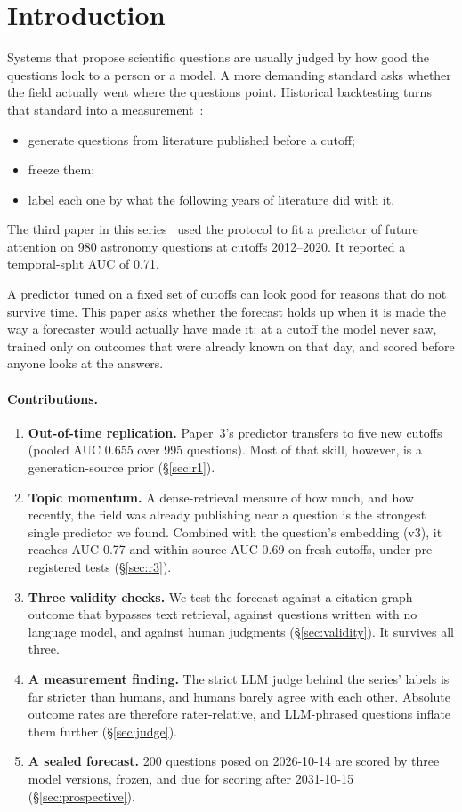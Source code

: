 \documentclass[11pt]{article}
\begin{document}
\section{Introduction}

Systems that propose scientific questions are usually judged by how good the
questions look to a person or a model. A more demanding standard asks whether
the field actually went where the questions point. Historical backtesting turns
that standard into a measurement~\cite{mao2026backtesting}:
\begin{itemize}
\item generate questions from literature published before a cutoff;
\item freeze them;
\item label each one by what the following years of literature did with it.
\end{itemize}
The third paper in this series~\cite{mao2026succeed} used the protocol to fit a predictor of future
attention on 980 astronomy questions at cutoffs 2012--2020. It reported a
temporal-split AUC of 0.71.

A predictor tuned on a fixed set of cutoffs can look good for reasons that do
not survive time. This paper asks whether the forecast holds up when it is made
the way a forecaster would actually have made it: at a cutoff the model never
saw, trained only on outcomes that were already known on that day, and scored
before anyone looks at the answers.

\paragraph{Contributions.}
\begin{enumerate}
\item \textbf{Out-of-time replication.} Paper~3's predictor transfers to five
  new cutoffs (pooled AUC 0.655 over 995 questions). Most of that skill,
  however, is a generation-source prior (\S\ref{sec:r1}).
\item \textbf{Topic momentum.} A dense-retrieval measure of how much, and how
  recently, the field was already publishing near a question is the strongest
  single predictor we found. Combined with the question's embedding (v3), it
  reaches AUC 0.77 and within-source AUC 0.69 on fresh cutoffs, under
  pre-registered tests (\S\ref{sec:r3}).
\item \textbf{Three validity checks.} We test the forecast against a
  citation-graph outcome that bypasses text retrieval, against questions
  written with no language model, and against human judgments
  (\S\ref{sec:validity}). It survives all three.
\item \textbf{A measurement finding.} The strict LLM judge behind the series'
  labels is far stricter than humans, and humans barely agree with each other.
  Absolute outcome rates are therefore rater-relative, and LLM-phrased
  questions inflate them further (\S\ref{sec:judge}).
\item \textbf{A sealed forecast.} 200 questions posed on 2026-10-14 are
  scored by three model versions, frozen, and due for scoring after 2031-10-15
  (\S\ref{sec:prospective}).
\end{enumerate}
\end{document}
